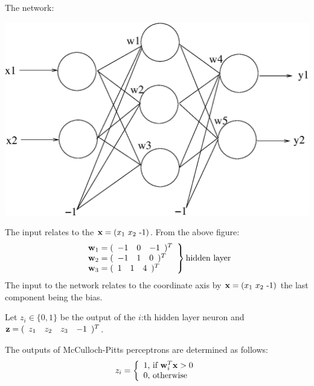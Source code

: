 \begin{enumerate}
\begin{solution}
    The network:
    \begin{center}
      \includegraphics[scale=0.35]{e61-2.eps}
    \end{center}
    The input relates to the   ${\bf x} = (x_1\ x_2\ \mbox{-1})$.
    From the above figure:
    \begin{equation*}
      \left.
        \begin{array}{l}
          {\bf{w}}_1=(\begin{array}{ccc}-1&0&-1\end{array})^T\\
          {\bf{w}}_2=(\begin{array}{ccc}-1&1&0\end{array})^T\\
          {\bf{w}}_3=(\begin{array}{ccc}1&1&4\end{array})^T
        \end{array}\right\}\mbox{hidden layer}
    \end{equation*}
    The input to the network relates to the coordinate axis by ${\bf x} = (x_1\ x_2\ \mbox{-1})$ the
    last component being the bias.

    Let $z_i \in\{0,1\}$ be the output of the $i$:th hidden layer neuron and ${\bf{z}}=(\begin{array}{cccc}z_1&z_2&z_3&-1\end{array})^T$.

    The outputs of McCulloch-Pitts perceptrons are determined as follows:
    \begin{equation*}
      z_i=\left\{\begin{array}{l}
          1 \mbox{, if }{\bf{w}}_i^T{\bf{x}} > 0\\
          0 \mbox{, otherwise}
        \end{array}\right.
    \end{equation*}


\end{solution}
\end{enumerate}
